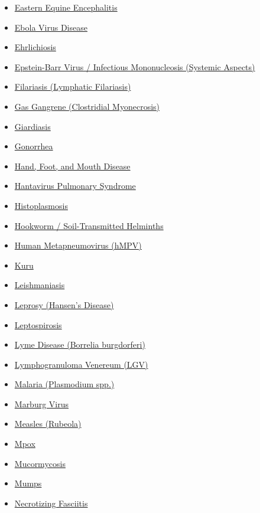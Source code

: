 \begin{itemize}[noitemsep]
  \item \hyperlink{sec:Eastern Equine Encephalitis}{Eastern Equine Encephalitis}
  \item \hyperlink{sec:Ebola Virus Disease}{Ebola Virus Disease}
  \item \hyperlink{sec:Ehrlichiosis}{Ehrlichiosis}
  \item \hyperlink{sec:Epstein-Barr Virus Systemic}{Epstein-Barr Virus / Infectious Mononucleosis (Systemic Aspects)}
  \item \hyperlink{sec:Filariasis}{Filariasis (Lymphatic Filariasis)}
  \item \hyperlink{sec:Gas Gangrene}{Gas Gangrene (Clostridial Myonecrosis)}
  \item \hyperlink{sec:Giardiasis}{Giardiasis}
  \item \hyperlink{sec:Gonorrhea}{Gonorrhea}
  \item \hyperlink{sec:Hand, Foot, and Mouth Disease}{Hand, Foot, and Mouth Disease}
  \item \hyperlink{sec:Hantavirus Pulmonary Syndrome}{Hantavirus Pulmonary Syndrome}
  \item \hyperlink{sec:Histoplasmosis}{Histoplasmosis}
  \item \hyperlink{sec:Hookworm Soil-Transmitted Helminths}{Hookworm / Soil-Transmitted Helminths}
  \item \hyperlink{sec:Human Metapneumovirus}{Human Metapneumovirus (hMPV)}
  \item \hyperlink{sec:Kuru}{Kuru}
  \item \hyperlink{sec:Leishmaniasis}{Leishmaniasis}
  \item \hyperlink{sec:Leprosy}{Leprosy (Hansen's Disease)}
  \item \hyperlink{sec:Leptospirosis}{Leptospirosis}
  \item \hyperlink{sec:Lyme Disease}{Lyme Disease (Borrelia burgdorferi)}
  \item \hyperlink{sec:Lymphogranuloma Venereum}{Lymphogranuloma Venereum (LGV)}
  \item \hyperlink{sec:Malaria}{Malaria (Plasmodium spp.)}
  \item \hyperlink{sec:Marburg Virus}{Marburg Virus}
  \item \hyperlink{sec:Measles}{Measles (Rubeola)}
  \item \hyperlink{sec:Mpox}{Mpox}
  \item \hyperlink{sec:Mucormycosis}{Mucormycosis}
  \item \hyperlink{sec:Mumps}{Mumps}
  \item \hyperlink{sec:Necrotizing Fasciitis}{Necrotizing Fasciitis}

\end{itemize}
